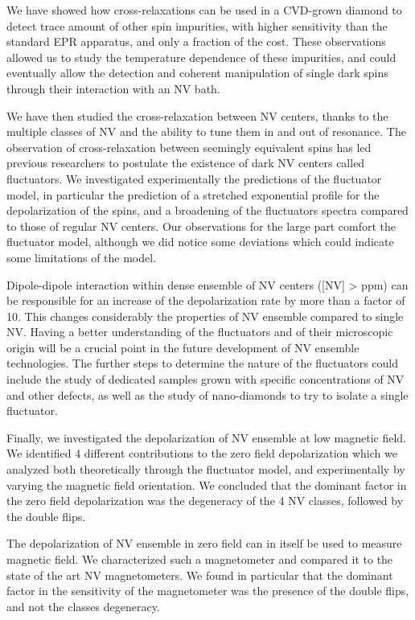 \documentclass[a4paper, 11pt]{book}
\begin{document}
We have showed how cross-relaxations can be used in a CVD-grown diamond to detect trace amount of other spin impurities, with higher sensitivity than the standard EPR apparatus, and only a fraction of the cost. These observations allowed us to study the temperature dependence of these impurities, and could eventually allow the detection and coherent manipulation of single dark spins through their interaction with an NV bath.

We have then studied the cross-relaxation between NV centers, thanks to the multiple classes of NV and the ability to tune them in and out of resonance. The observation of cross-relaxation between seemingly equivalent spins has led previous researchers to postulate the existence of dark NV centers called fluctuators. We investigated experimentally the predictions of the fluctuator model, in particular the prediction of a stretched exponential profile for the depolarization of the spins, and a broadening of the fluctuators spectra compared to those of regular NV centers. Our observations for the large part comfort the fluctuator model, although we did notice some deviations which could indicate some limitations of the model. 

Dipole-dipole interaction within dense ensemble of NV centers ([NV] > ppm) can be responsible for an increase of the depolarization rate by more than a factor of 10. This changes considerably the properties of NV ensemble compared to single NV. Having a better understanding of the fluctuators and of their microscopic origin will be a crucial point in the future development of NV ensemble technologies. The further steps to determine the nature of the fluctuators could include the study of dedicated samples grown with specific concentrations of NV and other defects, as well as the study of nano-diamonds to try to isolate a single fluctuator.

Finally, we investigated the depolarization of NV ensemble at low magnetic field. We identified 4 different contributions to the zero field depolarization which we analyzed both theoretically through the fluctuator model, and experimentally by varying the magnetic field orientation. We concluded that the dominant factor in the zero field depolarization was the degeneracy of the 4 NV classes, followed by the double flips. 

The depolarization of NV ensemble in zero field can in itself be used to measure magnetic field. We characterized such a magnetometer and compared it to the state of the art NV magnetometers. We found in particular that the dominant factor in the sensitivity of the magnetometer was the presence of the double flips, and not the classes degeneracy. 
\end{document}
